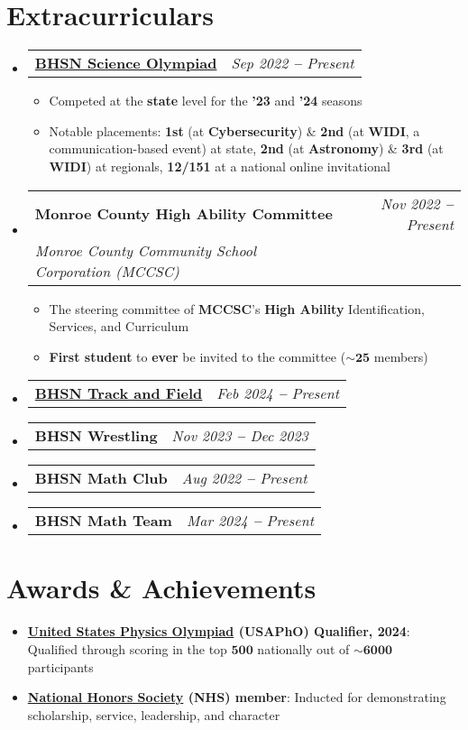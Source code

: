 \documentclass[letterpaper,9pt]{article}
\makeatletter
\newcommand{\cvSubItem}[1]{
  \item\small{
    {#1 \vspace{-2pt}}
  }
}
\newcommand{\cvThree}[3]{
  \vspace{-2pt}\item
    \begin{tabular*}{1\textwidth}[t]{l@{\extracolsep{\fill}}r}
      \textbf{#1} & \textit{\small #2} \\
      \textit{\small #3} \\
    \end{tabular*}\vspace{-5pt}
}
\newcommand{\cvTwo}[2]{
  \vspace{-2pt}\item
    \begin{tabular*}{1\textwidth}[t]{l@{\extracolsep{\fill}}r}
      \textbf{#1} & \textit{\small #2} \\
    \end{tabular*}\vspace{-5pt}
}
\newcommand{\cvItem}[1]{
  \item{
    #1
  }
  \vspace{-5pt}
}
\newcommand{\cvBodyStart}{\begin{itemize}[leftmargin=0.15in, label={}]}
\newcommand{\cvBodyEnd}{\end{itemize}}
\newcommand{\cvListStart}{\begin{itemize}}
\newcommand{\cvListEnd}{\end{itemize}\vspace{-5pt}}
\newcommand{\cvRegListStart}{\begin{itemize}[leftmargin=0.22in, label={}]}
\newcommand{\cvRegListEnd}{\end{itemize}}
\makeatother
\begin{document}
\section{Extracurriculars}
\cvBodyStart
    \cvTwo{\href{https://pbossev.pages.dev/extracurriculars/scioly/}{BHSN Science Olympiad}}{Sep 2022 \textbf{--} Present}
        \cvListStart
            \cvSubItem{Competed at the \textbf{state} level for the \textbf{'23} and \textbf{'24} seasons}
            \cvSubItem{Notable placements: \textbf{1st} (at \textbf{Cybersecurity}) \& \textbf{2nd} (at \textbf{WIDI}, a communication-based event) at state, \textbf{2nd} (at 
            \textbf{Astronomy}) \& \textbf{3rd} (at \textbf{WIDI}) at regionals, \textbf{12/151} at a national online invitational}
        \cvListEnd
    \cvThree{Monroe County High Ability Committee}{Nov 2022 \textbf{--} Present}{Monroe County Community School Corporation (MCCSC)}
        \cvListStart
            \cvSubItem{The steering committee of \textbf{MCCSC}'s \textbf{High Ability} Identification, Services, and Curriculum}
            \cvSubItem{\textbf{First student} to \textbf{ever} be invited to the committee ($\mathbf{\sim25}$ members)}
        \cvListEnd
    \cvTwo{\href{https://pbossev.pages.dev/extracurriculars/field/}{BHSN Track and Field}}{Feb 2024 \textbf{--} Present}
    \vspace{-10pt}
    \cvTwo{BHSN Wrestling}{Nov 2023 \textbf{--} Dec 2023}
    \vspace{-10pt}
    \cvTwo{BHSN Math Club}{Aug 2022 \textbf{--} Present}
    \vspace{-10pt}
    \cvTwo{BHSN Math Team}{Mar 2024 \textbf{--} Present}
    \vspace{-10pt}
\cvBodyEnd

\section{Awards \& Achievements}
\cvRegListStart
    \cvItem{\textbf{\href{https://www.aapt.org/physicsteam/PT-landing.cfm}{United States Physics Olympiad} (USAPhO) Qualifier, 2024}: Qualified through scoring in the top $\mathbf{500}$ nationally out of $\mathbf{\sim6000}$ participants}
    \cvItem{\textbf{\href{https://www.nationalhonorsociety.org/}{National Honors Society} (NHS) member}: Inducted for demonstrating scholarship, service, leadership, and character}
    \vspace{-10pt}
\cvRegListEnd
\end{document}
